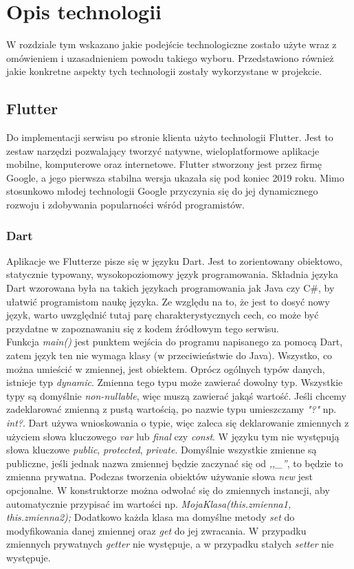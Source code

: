 \chapter{Opis technologii}
\thispagestyle{chapterBeginStyle}

W rozdziale tym wskazano jakie podejście technologiczne zostało użyte wraz z omówieniem i %
uzasadnieniem powodu takiego wyboru. Przedstawiono również jakie konkretne aspekty tych technologii zostały wykorzystane w projekcie.

\section{Flutter}

Do implementacji serwisu po stronie klienta użyto technologii Flutter. Jest to zestaw narzędzi pozwalający tworzyć natywne, wieloplatformowe aplikacje mobilne, komputerowe oraz internetowe. Flutter stworzony jest przez firmę Google, a jego pierwsza stabilna wersja ukazała się pod koniec 2019 roku. Mimo stosunkowo młodej technologii Google przyczynia się do jej dynamicznego rozwoju i zdobywania popularności wśród programistów. 

\subsection{Dart}

Aplikacje we Flutterze pisze się w języku Dart. Jest to zorientowany obiektowo, statycznie typowany, wysokopoziomowy język programowania. Składnia języka Dart wzorowana była na takich językach programowania jak Java czy C\#, by ułatwić programistom naukę języka. Ze względu na to, że jest to dosyć nowy język, warto uwzględnić tutaj parę charakterystycznych cech, co może być przydatne w zapoznawaniu się z kodem źródłowym tego serwisu. \\

Funkcja \emph{main()} jest punktem wejścia do programu napisanego za pomocą Dart, zatem język ten nie wymaga klasy (w przeciwieństwie do Java). Wszystko, co można umieścić %
w zmiennej, jest obiektem. Oprócz ogólnych typów danych, istnieje typ \emph{dynamic}. Zmienna tego typu może zawierać dowolny typ. Wszystkie typy są domyślnie \emph{non-nullable}, więc muszą zawierać jakąś wartość. Jeśli chcemy zadeklarować zmienną z pustą wartością, po nazwie typu umieszczamy \emph{"?"} np. \emph{int?}. Dart używa wnioskowania o typie, więc zaleca się deklarowanie zmiennych z użyciem słowa kluczowego \emph{var} lub \emph{final} czy \emph{const}. W języku tym nie występują słowa kluczowe \emph{public}, \emph{protected}, \emph{private}. Domyślnie wszystkie zmienne są publiczne, jeśli jednak nazwa zmiennej będzie zaczynać się od \emph{,,\_''}, to będzie to zmienna prywatna. Podczas tworzenia obiektów używanie słowa \emph{new} jest opcjonalne. W konstruktorze można odwołać się do zmiennych instancji, aby automatycznie przypisać im wartości np. \emph{MojaKlasa(this.zmienna1, this.zmienna2);} Dodatkowo każda klasa ma domyślne metody \emph{set} do modyfikowania danej zmiennej oraz \emph{get} do jej zwracania. W przypadku zmiennych prywatnych \emph{getter} nie występuje, a w przypadku stałych \emph{setter} nie występuje. \\

